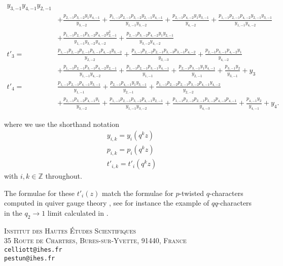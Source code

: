 \documentclass[11pt, oneside, reqno]{amsart}
\theoremstyle{definition} \newtheorem{definition}{Definition}[section]
\theoremstyle{definition} \newtheorem{remark}[definition]{Remark}
\theoremstyle{definition} \newtheorem{remarks}[definition]{Remarks}
\theoremstyle{definition} \newtheorem{question}[definition]{Question}
\theoremstyle{definition} \newtheorem*{note}{Note}
\theoremstyle{definition} \newtheorem{example}[definition]{Example}
\theoremstyle{definition} \newtheorem{examples}[definition]{Examples}
\begin{document}
\begin{align*}
{   y_{3,-1} y_{4,-1}}{y_{2,-1}}\\&+\frac{p_{2,-1} p_{3,-2} y_{1} y_{4,-1}}{y_{3,-2}}+\frac{p_{1,-1} p_{2,-1} p_{3,-2} y_{2,-1} y_{4,-1}}{y_{1,-1} y_{3,-2}}+\frac{p_{2,-1} p_{4,-2} y_{1} y_{3,-1}}{y_{4,-2}}+\frac{p_{1,-1} p_{2,-1}
   p_{4,-2} y_{2,-1} y_{3,-1}}{y_{1,-1} y_{4,-2}}\\&+\frac{p_{1,-1} p_{2,-1} p_{3,-2} p_{4,-2} y_{2,-1}^2}{y_{1,-1} y_{3,-2} y_{4,-2}}+\frac{p_{2,-1} p_{3,-2} p_{4,-2} y_{1} y_{2,-1}}{y_{3,-2} y_{4,-2}} \\
 t'_{3}= &\frac{p_{1,-1} p_{2,-2} p_{2,-1} p_{3,-1} p_{4,-2} y_{3,-2}}{y_{2,-2}}+\frac{p_{1,-1} p_{2,-2} p_{2,-1} p_{3,-3} p_{3,-1} p_{4,-2}}{y_{3,-3}}+\frac{p_{2,-1} p_{3,-1} p_{4,-2} y_{1}}{y_{4,-2}}\\&+\frac{p_{1,-1} p_{2,-1}
   p_{3,-1} p_{4,-2} y_{2,-1}}{y_{1,-1} y_{4,-2}}+\frac{p_{1,-1} p_{2,-1} p_{3,-1} y_{4,-1}}{y_{1,-1}}+\frac{p_{2,-1} p_{3,-1} y_{1} y_{4,-1}}{y_{2,-1}}+\frac{p_{3,-1} y_{2}}{y_{3,-1}}+y_{3} \\
 t'_{4}= &\frac{p_{1,-1} p_{2,-1} p_{4,-1} y_{3,-1}}{y_{1,-1}}+\frac{p_{2,-1} p_{4,-1} y_{1} y_{3,-1}}{y_{2,-1}}+\frac{p_{1,-1} p_{2,-2} p_{2,-1} p_{3,-2} p_{4,-1} y_{4,-2}}{y_{2,-2}}\\&+\frac{p_{2,-1} p_{3,-2} p_{4,-1}
   y_{1}}{y_{3,-2}}+\frac{p_{1,-1} p_{2,-1} p_{3,-2} p_{4,-1} y_{2,-1}}{y_{1,-1} y_{3,-2}}+\frac{p_{1,-1} p_{2,-2} p_{2,-1} p_{3,-2} p_{4,-3} p_{4,-1}}{y_{4,-3}}+\frac{p_{4,-1} y_{2}}{y_{4,-1}}+y_{4}.
\end{align*}

where we use the shorthand notation
\begin{equation*}
\begin{aligned}
y_{i,k} = y_i(q^{k}z) \\ p_{i,k} = p_i(q^{k} z)\\ t'_{i,k} = t'_{i}(q^{k} z)
\end{aligned}
\end{equation*}
 with $i, k \in \mathbb{Z}$ throughout. 

The formulae for these $t'_{i}(z)$ match the formulae for $p$-twisted $q$-characters computed in quiver gauge theory \cite{NekrasovPestunShatashvili}, see for instance the example of $qq$-characters in the $q_2 \to 1$ limit calculated in \cite{Nekrasov:2015wsu}. 




\textsc{Institut des Hautes \'Etudes Scientifiques}\\
\textsc{35 Route de Chartres, Bures-sur-Yvette, 91440, France}\\
\texttt{celliott@ihes.fr}\\ 
\texttt{pestun@ihes.fr}
 
\end{document}
